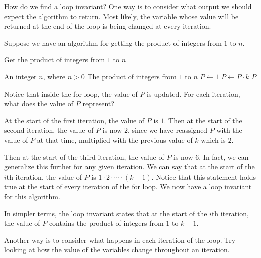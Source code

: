 How do we find a loop invariant? One way is to consider what output we should expect the algorithm to return. Most likely, the variable whose value will be returned at the end of the loop is being changed at every iteration.

\begin{example}
    Suppose we have an algorithm for getting the product of integers from $1$ to $n$.
    \begin{algorithm}[H]
        \caption{Get the product of integers from $1$ to $n$ }
        \begin{algorithmic}[1]
            \Require An integer $n$, where $n>0$ 
            \Ensure The product of integers from $1$ to $n$ 
            \State $P \gets 1$
            \State $P \gets P \cdot k$ 
            \EndFor
            \Return $P$
            \EndFunction
        \end{algorithmic}
    \end{algorithm}

    Notice that inside the for loop, the value of $P$ is updated. For each iteration, what does the value of $P$ represent? 

    At the start of the first iteration, the value of $P$ is $1$. Then at the start of the second iteration, the value of $P$ is now $2$, since we have reassigned $P$ with the value of $P$ at that time, multiplied with the previous value of $k$ which is $2$. 

    Then at the start of the third iteration, the value of $P$ is now $6$. In fact, we can generalize this further for any given iteration. We can say that at the start of the $i$th iteration, the value of $P$ is $1 \cdot 2 \cdot \cdots \cdot \left(k-1\right)$. Notice that this statement holds true at the start of every iteration of the for loop. We now have a loop invariant for this algorithm.

    In simpler terms, the loop invariant states that at the start of the $i$th iteration, the value of $P$ contains the product of integers from $1$ to $k-1$.
\end{example}

Another way is to consider what happens in each iteration of the loop. Try looking at how the value of the variables change throughout an iteration.

